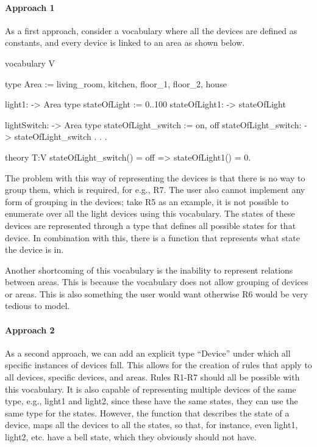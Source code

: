 \documentclass[11pt,a4paper]{report}
\begin{document}
\paragraph{Approach 1}
As a first approach, consider a vocabulary where all the devices are defined as constants, and every device is linked to an area as shown below.

\begin{idplisting}
vocabulary V {
    type Area := {living_room, kitchen, floor_1, floor_2, house}

    light1: -> Area
    type stateOfLight := {0..100}
    stateOfLight1: -> stateOfLight

    lightSwitch: -> Area
    type stateOfLight_switch := {on, off}
    stateOfLight_switch: -> stateOfLight_switch
    .
    .
    .
}

theory T:V {
    stateOfLight_switch() = off => stateOfLight1() = 0.
}
\end{idplisting}

The problem with this way of representing the devices is that there is no way to group them, which is required, for e.g., R7. The user also cannot implement any form of grouping in the devices; take R5 as an example, it is not possible to enumerate over all the light devices using this vocabulary. The states of these devices are represented through a type that defines all possible states for that device. In combination with this, there is a function that represents what state the device is in.

Another shortcoming of this vocabulary is the inability to represent relations between areas. This is because the vocabulary does not allow grouping of devices or areas. This is also something the user would want otherwise R6 would be very tedious to model.

\paragraph{Approach 2}
As a second approach, we can add an explicit type ``Device'' under which all specific instances of devices fall. This allows for the creation of rules that apply to all devices, specific devices, and areas. Rules R1-R7 should all be possible with this vocabulary. It is also capable of representing multiple devices of the same type, e.g., light1 and light2, since these have the same states, they can use the same type for the states. However, the function that describes the state of a device, maps all the devices to all the states, so that, for instance, even light1, light2, etc. have a bell state, which they obviously should not have.
\end{document}
